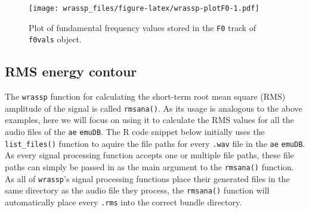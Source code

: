 \documentclass[
]{book}
\newenvironment{Shaded}{\begin{snugshade}}{\end{snugshade}}
\newcommand{\AttributeTok}[1]{\textcolor[rgb]{0.77,0.63,0.00}{#1}}
\newcommand{\CommentTok}[1]{\textcolor[rgb]{0.56,0.35,0.01}{\textit{#1}}}
\newcommand{\ConstantTok}[1]{\textcolor[rgb]{0.00,0.00,0.00}{#1}}
\newcommand{\DecValTok}[1]{\textcolor[rgb]{0.00,0.00,0.81}{#1}}
\newcommand{\FunctionTok}[1]{\textcolor[rgb]{0.00,0.00,0.00}{#1}}
\newcommand{\NormalTok}[1]{#1}
\newcommand{\OtherTok}[1]{\textcolor[rgb]{0.56,0.35,0.01}{#1}}
\newcommand{\SpecialCharTok}[1]{\textcolor[rgb]{0.00,0.00,0.00}{#1}}
\newcommand{\StringTok}[1]{\textcolor[rgb]{0.31,0.60,0.02}{#1}}
\begin{document}
\begin{figure}
\centering
\texttt{[image: wrassp\_files/figure-latex/wrassp-plotF0-1.pdf]}
\caption{\label{fig:wrassp-plotF0}Plot of fundamental frequency values stored in the \texttt{F0} track of \texttt{f0vals} object.}
\end{figure}

\hypertarget{subsec:wrassp-RMS}{%
\subsection{RMS energy contour}\label{subsec:wrassp-RMS}}

The \texttt{wrassp} function for calculating the short-term root mean square (RMS) amplitude of the signal is called \texttt{rmsana()}. As its usage is analogous to the above examples, here we will focus on using it to calculate the RMS values for all the audio files of the \texttt{ae} \texttt{emuDB}. The R code snippet below initially uses the \texttt{list\_files()} function to aquire the file paths for every \texttt{.wav} file in the \texttt{ae} \texttt{emuDB}. As every signal processing function accepts one or multiple file paths, these file paths can simply be passed in as the main argument to the \texttt{rmsana()} function. As all of \texttt{wrassp}'s signal processing functions place their generated files in the same directory as the audio file they process, the \texttt{rmsana()} function will automatically place every \texttt{.rms} into the correct bundle directory.

\begin{Shaded}
\end{Shaded}
\end{document}
